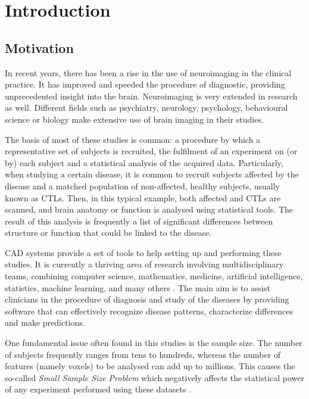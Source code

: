 \chapter{Introduction}\label{ch:introduction}
\section{Motivation}
In recent years, there has been a rise in the use of neuroimaging in the clinical practice. It has improved and speeded the procedure of diagnostic, providing unprecedented insight into the brain. Neuroimaging is very extended in research as well. Different fields such as psychiatry, neurology, psychology, behavioural science or biology make extensive use of brain imaging in their studies. 

The basis of most of these studies is common: a procedure by which a representative set of subjects is recruited, the fulfilment of an experiment on (or by) each subject and a statistical analysis of the acquired data. Particularly, when studying a certain disease, it is common to recruit subjects affected by the disease and a matched population of non-affected, healthy subjects, usually known as \acp{CTL}. Then, in this typical example, both affected and \acp{CTL} are scanned, and brain anatomy or function is analysed using statistical tools. The result of this analysis is frequently a list of significant differences between structure or function that could be linked to the disease. 

\acf{CAD} systems provide a set of tools to help setting up and performing these studies. It is currently a thriving area of research involving multidisciplinary teams, combining computer science, mathematics, medicine, artificial intelligence, statistics, machine learning, and many others \cite{Martinez-Murcia2016}. The main aim is to assist clinicians in the procedure of diagnosis and study of the diseases by providing software that can effectively recognize disease patterns, characterize differences and make predictions. 

One fundamental issue often found in this studies is the sample size. The number of subjects frequently ranges from tens to hundreds, whereas the number of features (namely voxels) to be analysed can add up to millions. This causes the so-called \emph{Small Sample Size Problem} \cite{Duin2000} which negatively affects the statistical power of any experiment performed using these datasets \cite{Button2013}. 

